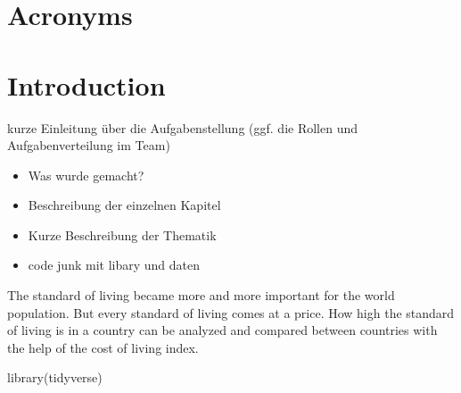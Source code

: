 \documentclass[
  11pt,
  a4paper,
  twoside]{scrbook}
\newenvironment{Shaded}{\begin{snugshade}}{\end{snugshade}}
\newcommand{\FunctionTok}[1]{\textcolor[rgb]{0.00,0.00,0.00}{#1}}
\newcommand{\NormalTok}[1]{#1}
\providecommand{\tightlist}{%
  \setlength{\itemsep}{0pt}\setlength{\parskip}{0pt}}
\begin{document}
{
\setcounter{tocdepth}{3}

{}

\tableofcontents
\newpage
}


\renewcommand{\cftfignumwidth}{6em}
\renewcommand{\cftfigpresnum}{Fig. }
{}
\listoffigures
\renewcommand{\cfttabnumwidth}{6em}
\renewcommand{\cfttabpresnum}{Tbl. }
{}
\listoftables
\newpage

\chapter*{Acronyms}
\begin{acronym}[XXXXX]

\end{acronym}
\clearpage


\setcounter{page}{1}

\doublespacing

\hypertarget{introduction}{%
\chapter{Introduction}\label{introduction}}

kurze Einleitung über die Aufgabenstellung (ggf. die Rollen und Aufgabenverteilung im Team)

\begin{itemize}
\tightlist
\item
  Was wurde gemacht?
\item
  Beschreibung der einzelnen Kapitel
\item
  Kurze Beschreibung der Thematik
\item
  code junk mit libary und daten
\end{itemize}

The standard of living became more and more important for the world population. But every standard of living comes at a price. How high the standard of living is in a country can be analyzed and compared between countries with the help of the cost of living index.

\linespread{1}

\begin{Shaded}
\begin{Highlighting}[]

\FunctionTok{library}\NormalTok{(tidyverse)}
\end{Highlighting}
\end{Shaded}
\end{document}
